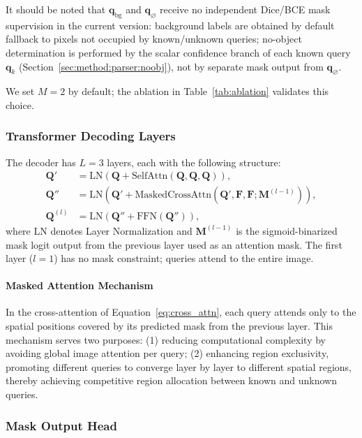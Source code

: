 \documentclass[journal]{IEEEtai}
\newcommand{\bF}{\mathbf{F}}
\newcommand{\bq}{\mathbf{q}}
\begin{document}
\noindent
It should be noted that $\bq_{\text{bg}}$ and $\bq_{\varnothing}$ receive no
independent Dice/BCE mask supervision in the current version:
background labels are obtained by default fallback to pixels not occupied by
known/unknown queries;
no-object determination is performed by the scalar confidence branch of each known
query $\bq_k$ (Section~\ref{sec:method:parser:noobj}), not by separate mask output
from $\bq_{\varnothing}$.

We set $M=2$ by default; the ablation in Table~\ref{tab:ablation} validates this choice.

\subsubsection{Transformer Decoding Layers}\label{sec:method:parser:decoder}

The decoder has $L=3$ layers, each with the following structure:
\begin{align}
  \mathbf{Q}' &= \text{LN}\!\left(\mathbf{Q} + \text{SelfAttn}(\mathbf{Q}, \mathbf{Q}, \mathbf{Q})\right), \label{eq:self_attn} \\
  \mathbf{Q}'' &= \text{LN}\!\left(\mathbf{Q}' + \text{MaskedCrossAttn}(\mathbf{Q}', \bF, \bF; \mathbf{M}^{(l-1)})\right), \label{eq:cross_attn} \\
  \mathbf{Q}^{(l)} &= \text{LN}\!\left(\mathbf{Q}'' + \text{FFN}(\mathbf{Q}'')\right), \label{eq:ffn}
\end{align}
where $\text{LN}$ denotes Layer Normalization and $\mathbf{M}^{(l-1)}$ is the
sigmoid-binarized mask logit output from the previous layer used as an attention mask.
The first layer ($l=1$) has no mask constraint; queries attend to the entire image.

\paragraph{Masked Attention Mechanism}
In the cross-attention of Equation~\eqref{eq:cross_attn}, each query attends only
to the spatial positions covered by its predicted mask from the previous layer.
This mechanism serves two purposes:
(1) reducing computational complexity by avoiding global image attention per query;
(2) enhancing region exclusivity, promoting different queries to converge layer by layer
to different spatial regions, thereby achieving competitive region allocation between
known and unknown queries.

\subsubsection{Mask Output Head}\label{sec:method:parser:mask}
\end{document}
